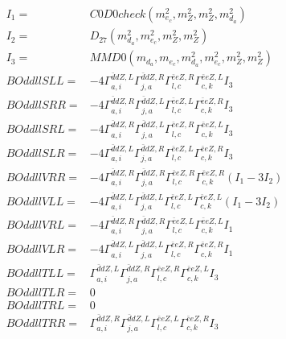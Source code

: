 \documentclass[A4,landscape]{article}
\begin{document}
\begin{align} 
I_1 = & C0D0check(m^2_{e_{{c}}}, m^2_{Z}, m^2_{Z}, m^2_{d_{{a}}}) \\ 
I_2 = & D_{27}(m^2_{d_{{a}}}, m^2_{e_{{c}}}, m^2_{Z}, m^2_{Z}) \\ 
I_3 = & MMD0(m_{d_{{a}}}, m_{e_{{c}}}, m^2_{d_{{a}}}, m^2_{e_{{c}}}, m^2_{Z}, m^2_{Z}) \\ 
  BOddllSLL= & -4  \Gamma^{\bar{d}d Z ,L}_{a, i} \Gamma^{\bar{d}d Z ,R}_{j, a} \Gamma^{\bar{e}e Z ,R}_{l, c} \Gamma^{\bar{e}e Z ,L}_{c, k} I_3 \\ 
  BOddllSRR= & -4  \Gamma^{\bar{d}d Z ,R}_{a, i} \Gamma^{\bar{d}d Z ,L}_{j, a} \Gamma^{\bar{e}e Z ,L}_{l, c} \Gamma^{\bar{e}e Z ,R}_{c, k} I_3 \\ 
  BOddllSRL= & -4  \Gamma^{\bar{d}d Z ,R}_{a, i} \Gamma^{\bar{d}d Z ,L}_{j, a} \Gamma^{\bar{e}e Z ,R}_{l, c} \Gamma^{\bar{e}e Z ,L}_{c, k} I_3 \\ 
  BOddllSLR= & -4  \Gamma^{\bar{d}d Z ,L}_{a, i} \Gamma^{\bar{d}d Z ,R}_{j, a} \Gamma^{\bar{e}e Z ,L}_{l, c} \Gamma^{\bar{e}e Z ,R}_{c, k} I_3 \\ 
  BOddllVRR= & -4  \Gamma^{\bar{d}d Z ,R}_{a, i} \Gamma^{\bar{d}d Z ,R}_{j, a} \Gamma^{\bar{e}e Z ,R}_{l, c} \Gamma^{\bar{e}e Z ,R}_{c, k} (I_1 - 3 I_2) \\ 
  BOddllVLL= & -4  \Gamma^{\bar{d}d Z ,L}_{a, i} \Gamma^{\bar{d}d Z ,L}_{j, a} \Gamma^{\bar{e}e Z ,L}_{l, c} \Gamma^{\bar{e}e Z ,L}_{c, k} (I_1 - 3 I_2) \\ 
  BOddllVRL= & -4  \Gamma^{\bar{d}d Z ,R}_{a, i} \Gamma^{\bar{d}d Z ,R}_{j, a} \Gamma^{\bar{e}e Z ,L}_{l, c} \Gamma^{\bar{e}e Z ,L}_{c, k} I_1 \\ 
  BOddllVLR= & -4  \Gamma^{\bar{d}d Z ,L}_{a, i} \Gamma^{\bar{d}d Z ,L}_{j, a} \Gamma^{\bar{e}e Z ,R}_{l, c} \Gamma^{\bar{e}e Z ,R}_{c, k} I_1 \\ 
  BOddllTLL= &  \Gamma^{\bar{d}d Z ,L}_{a, i} \Gamma^{\bar{d}d Z ,R}_{j, a} \Gamma^{\bar{e}e Z ,R}_{l, c} \Gamma^{\bar{e}e Z ,L}_{c, k} I_3 \\ 
  BOddllTLR= & 0 \\ 
  BOddllTRL= & 0 \\ 
  BOddllTRR= &  \Gamma^{\bar{d}d Z ,R}_{a, i} \Gamma^{\bar{d}d Z ,L}_{j, a} \Gamma^{\bar{e}e Z ,L}_{l, c} \Gamma^{\bar{e}e Z ,R}_{c, k} I_3 \\ 
\end{align} 
\end{document}

